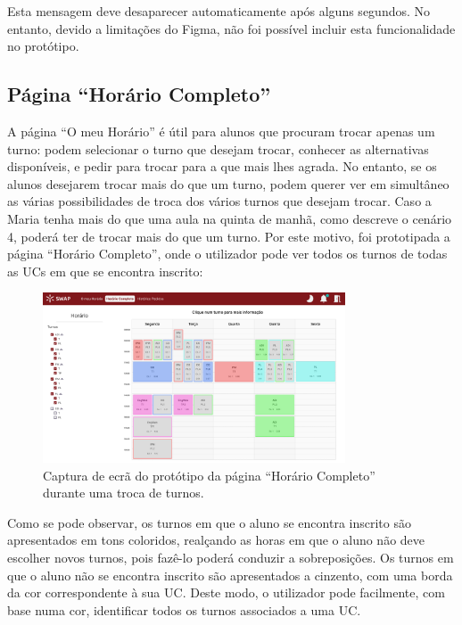 \documentclass[12pt, a4paper]{article}
\begin{document}
Esta mensagem deve desaparecer automaticamente após alguns segundos. No entanto, devido a limitações
do Figma, não foi possível incluir esta funcionalidade no protótipo.

\subsection{Página ``Horário Completo''}

A página ``O meu Horário'' é útil para alunos que procuram trocar apenas um turno: podem selecionar
o turno que desejam trocar, conhecer as alternativas disponíveis, e pedir para trocar para a que
mais lhes agrada. No entanto, se os alunos desejarem trocar mais do que um turno, podem querer ver
em simultâneo as várias possibilidades de troca dos vários turnos que desejam trocar. Caso a Maria
tenha mais do que uma aula na quinta de manhã, como descreve o cenário 4, poderá ter de trocar mais
do que um turno. Por este motivo, foi prototipada a página ``Horário Completo'', onde o utilizador
pode ver todos os turnos de todas as UCs em que se encontra inscrito:

\begin{figure}[H]
    \centering
    \includegraphics[width=0.8\textwidth]{res/prototype/horario-completo.png}
    \caption{
        \onehalfspacing
        Captura de ecrã do protótipo da página ``Horário Completo'' durante uma troca de turnos.
    }
    \label{horario-completo}
\end{figure}

Como se pode observar, os turnos em que o aluno se encontra inscrito são apresentados em tons
coloridos, realçando as horas em que o aluno não deve escolher novos turnos, pois fazê-lo poderá
conduzir a sobreposições. Os turnos em que o aluno não se encontra inscrito são apresentados a
cinzento, com uma borda da cor correspondente à sua UC. Deste modo, o utilizador pode facilmente,
com base numa cor, identificar todos os turnos associados a uma UC.
\end{document}
